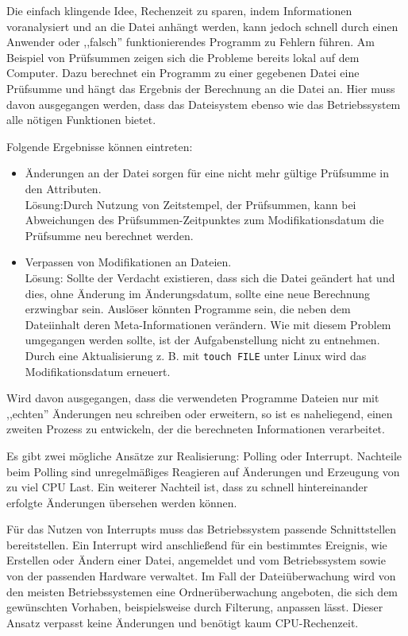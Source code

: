 \documentclass[oneside, ngerman, toc=bibliography,bibliography=totoc,listof=entryprefix, open=right,numbers=noenddot,fontsize=12pt]{scrbook}
\begin{document}
Die einfach klingende Idee, Rechenzeit zu sparen, indem Informationen voranalysiert und an die Datei anhängt werden, kann jedoch schnell durch einen Anwender oder ,,falsch'' funktionierendes Programm zu Fehlern führen. Am Beispiel von Prüfsummen zeigen sich die Probleme bereits lokal auf dem Computer. Dazu berechnet ein Programm zu einer gegebenen Datei eine Prüfsumme und hängt das Ergebnis der Berechnung an die Datei an. Hier muss davon ausgegangen werden, dass das Dateisystem ebenso wie das Betriebssystem alle nötigen Funktionen bietet.

\bigskip
Folgende Ergebnisse können eintreten:
\begin{itemize}
	\item Änderungen an der Datei sorgen für eine nicht mehr gültige Prüfsumme in den Attributen.\\
    Lösung:Durch Nutzung von Zeitstempel, der Prüfsummen, kann bei Abweichungen des Prüfsummen-Zeitpunktes zum Modifikationsdatum die Prüfsumme neu berechnet werden.
    
	\item Verpassen von Modifikationen an Dateien.\\
     Lösung: Sollte der Verdacht existieren, dass sich die Datei geändert hat und dies, ohne Änderung im Änderungsdatum, sollte eine neue Berechnung erzwingbar sein.
     Auslöser könnten Programme sein, die neben dem Dateiinhalt deren Meta-Informationen verändern. Wie mit diesem Problem umgegangen werden sollte, ist der Aufgabenstellung nicht zu entnehmen. 
     Durch eine Aktualisierung z. B. mit \verb|touch FILE| unter Linux wird das Modifikationsdatum erneuert.
     
\end{itemize}

Wird davon ausgegangen, dass die verwendeten Programme Dateien nur mit ,,echten'' Änderungen neu schreiben oder erweitern, so ist es naheliegend, einen zweiten Prozess zu entwickeln, der die berechneten Informationen verarbeitet.

Es gibt zwei mögliche Ansätze zur Realisierung: {Polling} oder {Interrupt}. Nachteile beim Polling sind unregelmäßiges Reagieren auf Änderungen und Erzeugung von zu viel CPU Last. Ein weiterer Nachteil ist, dass zu schnell hintereinander erfolgte Änderungen übersehen werden können.

Für das Nutzen von {Interrupts} muss das Betriebssystem passende Schnittstellen bereitstellen. Ein {Interrupt} wird anschließend für ein bestimmtes Ereignis, wie Erstellen oder Ändern einer Datei, angemeldet und vom Betriebssystem sowie von der passenden Hardware verwaltet. Im Fall der Dateiüberwachung wird von den meisten Betriebssystemen eine Ordnerüberwachung angeboten, die sich dem gewünschten Vorhaben, beispielsweise durch Filterung, anpassen lässt. Dieser Ansatz verpasst keine Änderungen und benötigt kaum CPU-Rechenzeit.
\end{document}
